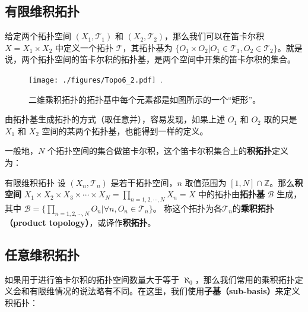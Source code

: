 

\subsection{有限维积拓扑}

给定两个拓扑空间 $(X_1, \mathcal{T}_1)$ 和 $(X_2, \mathcal{T}_2)$，那么我们可以在笛卡尔积 $X=X_1\times X_2$ 中定义一个拓扑 $\mathcal{T}$，其拓扑基为 $\{O_1\times O_2|O_1\in\mathcal{T_1}, O_2\in\mathcal{T_2}\}$。就是说，两个拓扑空间的笛卡尔积的拓扑基，是两个空间中开集的笛卡尔积的集合。

\begin{figure}[ht]
\centering
\texttt{[image: ./figures/Topo6\_2.pdf]}~.
\caption{二维乘积拓扑的拓扑基中每个元素都是如图所示的一个“矩形”。} \label{Topo6_fig2}
\end{figure}

由拓扑基生成拓扑的方式（取任意并），容易发现，如果上述 $O_1$ 和 $O_2$ 取的只是 $X_1$ 和 $X_2$ 空间的某两个拓扑基，也能得到一样的定义。

一般地，$N$ 个拓扑空间的集合做笛卡尔积，这个笛卡尔积集合上的\textbf{积拓扑}定义为：

\begin{definition}{有限维积拓扑}
设 $(X_n, \mathcal{T}_n)$ 是若干拓扑空间，$n$ 取值范围为 $[1, N]\cap\mathbb{Z}$。那么\textbf{积空间} $X_1\times X_2\times X_3\times\cdots\times X_N=\prod\limits_{n=1,2,\cdots,N}X_n=X$ 中的拓扑由\textbf{拓扑基} $\mathcal{B}$ 生成，其中 $\mathcal{B}=\{\prod\limits_{n=1,2,\cdots,N}O_n|\forall n, O_n\in\mathcal{T}_n\}$。
称这个拓扑为各$\mathcal{T}_n$的\textbf{乘积拓扑（product topology）}，或译作\textbf{积拓扑}。
\end{definition}

\subsection{任意维积拓扑}

如果用于进行笛卡尔积的拓扑空间数量大于等于 $\aleph_0$，那么我们常用的乘积拓扑定义会和有限维情况的说法略有不同。在这里，我们使用\textbf{子基（sub-basis）}来定义积拓扑：

